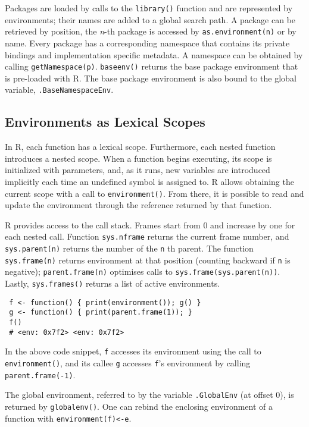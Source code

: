 \documentclass[10pt,sigplan,authorversion=true]{acmart}
\renewcommand{\c}[1]{\lstinline |#1|\xspace}
\begin{document}
Packages are loaded by calls to the \c{library()} function and are represented
by environments; their names are added to a global search path. A package can be
retrieved by position, the \emph{n}-th package is accessed by
\c{as.environment(n)} or by name. Every package has a corresponding namespace
that contains its private bindings and implementation specific metadata. A
namespace can be obtained by calling \c{getNamespace(p)}. \c{baseenv()} returns
the base package environment that is pre-loaded with R. The base package
environment is also bound to the global variable, \c{.BaseNamespaceEnv}.


\subsection{Environments as Lexical Scopes}

In R, each function has a lexical scope. Furthermore, each nested function
introduces a nested scope. When a function begins executing, its scope is
initialized with parameters, and, as it runs, new variables are introduced
implicitly each time an undefined symbol is assigned to. R allows obtaining the
current scope with a call to \c{environment()}. From there, it is possible to
read and update the environment through the reference returned by that function.

R provides access to the call stack. Frames start from 0 and increase by one
for each nested call. Function \c{sys.nframe} returns the current frame
number, and \c{sys.parent(n)} returns the number of the \c{n}th parent.
The function \c{sys.frame(n)} returns environment at that position (counting
backward if \c{n} is negative); \c{parent.frame(n)} optimises calls to
\c{sys.frame(sys.parent(n))}. Lastly, \c{sys.frames()} returns a list of
active environments.

\begin{lstlisting}
 f <- function() { print(environment()); g() }
 g <- function() { print(parent.frame(1)); }
 f()
 # <env: 0x7f2> <env: 0x7f2>
\end{lstlisting}

\noindent
In the above code snippet, \c{f} accesses its environment using the call to
\c{environment()}, and its callee \c{g} accesses \c{f}'s environment by calling
\c{parent.frame(-1)}.

The global environment, referred to by the variable \c{.GlobalEnv} (at offset
0), is returned by \c{globalenv()}. One can rebind the enclosing environment of
a function with \c{environment(f)<-e}.
\end{document}
